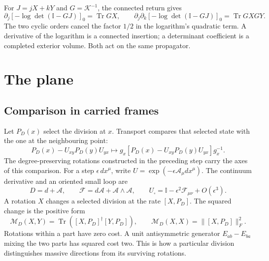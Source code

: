 \documentclass[aps,prx,onecolumn,10pt,notitlepage,nofootinbib,longbibliography]{revtex4-2}
\numberwithin{equation}{section}
\numberwithin{table}{section}
\newcommand{\Id}{\mathbb I}
\newcommand{\Tr}{\operatorname{Tr}}
\begin{document}
For $J=jX+kY$ and $G={\mathcal K}^{-1}$, the connected return gives
\begin{equation}
 \partial_j[-\log\det(\Id-GJ)]_0=\Tr GX,\qquad
 \partial_j\partial_k[-\log\det(\Id-GJ)]_0=\Tr GXGY.
 \label{eq:connectedinsertions}
\end{equation}
The two cyclic orders cancel the factor $1/2$ in the logarithm's quadratic
term. A derivative of the logarithm is a connected insertion; a determinant
coefficient is a completed exterior volume. Both act on the same propagator.

\section{The plane}
\label{sec:step-five}
\label{sec:sources}

\subsection{Comparison in carried frames}
Let $P_D(x)$ select the division at $x$. Transport compares that selected state with the one at the neighbouring point:
\begin{equation}
 P_D(x)-U_{xy}P_D(y)U_{yx}\longmapsto
 g_x[P_D(x)-U_{xy}P_D(y)U_{yx}]g_x^{-1}.
 \label{eq:transportedsubtraction}
\end{equation}
The degree-preserving rotations constructed in the preceding step carry the axes of this comparison. For a step $\epsilon\,dx^\mu$, write $U=\exp(-\epsilon\mathcal A_\mu dx^\mu)$. The continuum derivative and an oriented small loop are
\begin{equation}
 D=d+\mathcal A,\qquad
 \mathcal F=d\mathcal A+\mathcal A\wedge\mathcal A,
 \qquad U_\square=\Id-\epsilon^2\mathcal F_{\mu\nu}+O(\epsilon^3).
 \label{eq:parallelcurvature}
\end{equation}
A rotation $X$ changes a selected division at the rate $[X,P_D]$. The squared change is the positive form
\begin{equation}
 \mathcal M_D(X,Y)=\Tr([X,P_D]^\dagger[Y,P_D]),\qquad
 \mathcal M_D(X,X)=\|[X,P_D]\|_F^2.
 \label{eq:positivemassform}
\end{equation}
Rotations within a part have zero cost. A unit antisymmetric generator $E_{ab}-E_{ba}$ mixing the two parts has squared cost two. This is how a particular division distinguishes massive directions from its surviving rotations.
\end{document}
